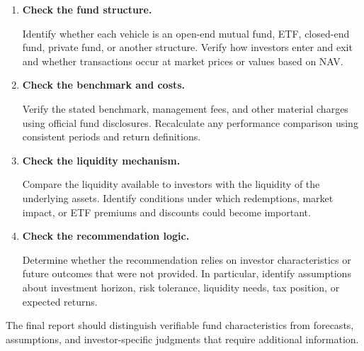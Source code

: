 \begin{enumerate}

\item \textbf{Check the fund structure.}

Identify whether each vehicle is an open-end mutual fund, ETF, closed-end fund, private fund, or another structure. Verify how investors enter and exit and whether transactions occur at market prices or values based on NAV.

\item \textbf{Check the benchmark and costs.}

Verify the stated benchmark, management fees, and other material charges using official fund disclosures. Recalculate any performance comparison using consistent periods and return definitions.

\item \textbf{Check the liquidity mechanism.}

Compare the liquidity available to investors with the liquidity of the underlying assets. Identify conditions under which redemptions, market impact, or ETF premiums and discounts could become important.

\item \textbf{Check the recommendation logic.}

Determine whether the recommendation relies on investor characteristics or future outcomes that were not provided. In particular, identify assumptions about investment horizon, risk tolerance, liquidity needs, tax position, or expected returns.

\end{enumerate}

The final report should distinguish verifiable fund characteristics from forecasts, assumptions, and investor-specific judgments that require additional information.



